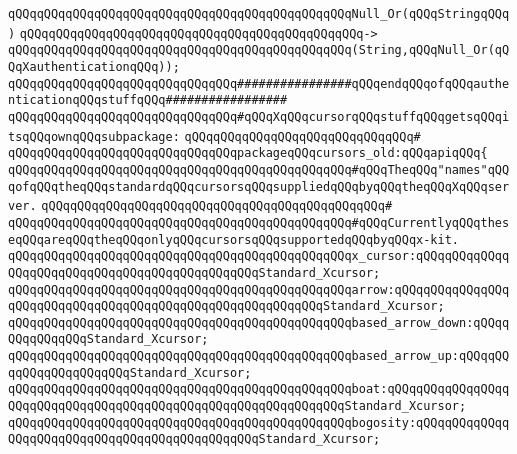 \verb|qQQqqQQqqQQqqQQqqQQqqQQqqQQqqQQqqQQqqQQqqQQqqQQqNull_Or(qQQqStringqQQq)|\newline
\verb|qQQqqQQqqQQqqQQqqQQqqQQqqQQqqQQqqQQqqQQqqQQqqQQq->|\newline
\verb|qQQqqQQqqQQqqQQqqQQqqQQqqQQqqQQqqQQqqQQqqQQqqQQq(String,qQQqNull_Or(qQQqXauthenticationqQQq));|\newline
\newline
\verb|qQQqqQQqqQQqqQQqqQQqqQQqqQQqqQQq################qQQqendqQQqofqQQqauthenticationqQQqstuffqQQq#################|\newline
\newline
\newline
\newline
\verb|qQQqqQQqqQQqqQQqqQQqqQQqqQQqqQQq#qQQqXqQQqcursorqQQqstuffqQQqgetsqQQqitsqQQqownqQQqsubpackage:|\newline
\verb|qQQqqQQqqQQqqQQqqQQqqQQqqQQqqQQq#|\newline
\verb|qQQqqQQqqQQqqQQqqQQqqQQqqQQqqQQqpackageqQQqcursors_old:qQQqapiqQQq{|\newline
\newline
\verb|qQQqqQQqqQQqqQQqqQQqqQQqqQQqqQQqqQQqqQQqqQQqqQQq#qQQqTheqQQq"names"qQQqofqQQqtheqQQqstandardqQQqcursorsqQQqsuppliedqQQqbyqQQqtheqQQqXqQQqserver.|\newline
\verb|qQQqqQQqqQQqqQQqqQQqqQQqqQQqqQQqqQQqqQQqqQQqqQQq#|\newline
\verb|qQQqqQQqqQQqqQQqqQQqqQQqqQQqqQQqqQQqqQQqqQQqqQQq#qQQqCurrentlyqQQqtheseqQQqareqQQqtheqQQqonlyqQQqcursorsqQQqsupportedqQQqbyqQQqx-kit.|\newline
\newline
\verb|qQQqqQQqqQQqqQQqqQQqqQQqqQQqqQQqqQQqqQQqqQQqqQQqx_cursor:qQQqqQQqqQQqqQQqqQQqqQQqqQQqqQQqqQQqqQQqqQQqqQQqStandard_Xcursor;|\newline
\verb|qQQqqQQqqQQqqQQqqQQqqQQqqQQqqQQqqQQqqQQqqQQqqQQqarrow:qQQqqQQqqQQqqQQqqQQqqQQqqQQqqQQqqQQqqQQqqQQqqQQqqQQqqQQqqQQqStandard_Xcursor;|\newline
\verb|qQQqqQQqqQQqqQQqqQQqqQQqqQQqqQQqqQQqqQQqqQQqqQQqbased_arrow_down:qQQqqQQqqQQqqQQqStandard_Xcursor;|\newline
\verb|qQQqqQQqqQQqqQQqqQQqqQQqqQQqqQQqqQQqqQQqqQQqqQQqbased_arrow_up:qQQqqQQqqQQqqQQqqQQqqQQqStandard_Xcursor;|\newline
\verb|qQQqqQQqqQQqqQQqqQQqqQQqqQQqqQQqqQQqqQQqqQQqqQQqboat:qQQqqQQqqQQqqQQqqQQqqQQqqQQqqQQqqQQqqQQqqQQqqQQqqQQqqQQqqQQqqQQqStandard_Xcursor;|\newline
\verb|qQQqqQQqqQQqqQQqqQQqqQQqqQQqqQQqqQQqqQQqqQQqqQQqbogosity:qQQqqQQqqQQqqQQqqQQqqQQqqQQqqQQqqQQqqQQqqQQqqQQqStandard_Xcursor;|\newline
